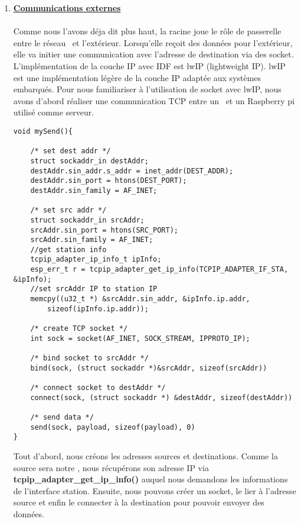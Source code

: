 \begin{enumerate}
        \item \textbf{\underline{Communications externes}}\\
            \\
            Comme nous l'avons déja dit plus haut, la racine joue le rôle de passerelle entre le réseau \espmesh\ 
            et l'extérieur. Lorsqu'elle reçoit des données pour l'extérieur, elle va initier une communication avec l'adresse
            de destination via des socket. L'implémentation de la couche IP avec IDF est lwIP (lightweight IP). lwIP est
            une implémentation légère de la couche IP adaptée aux systèmes embarqués. Pour nous familiariser à l'utilisation
            de socket avec lwIP, nous avons d'abord réaliser une communication TCP entre un \esp\ et un Raspberry pi utilisé
            comme serveur.
            \begin{verbatim}
void mySend(){

    /* set dest addr */
    struct sockaddr_in destAddr;
    destAddr.sin_addr.s_addr = inet_addr(DEST_ADDR);
    destAddr.sin_port = htons(DEST_PORT);
    destAddr.sin_family = AF_INET;

    /* set src addr */
    struct sockaddr_in srcAddr;
    srcAddr.sin_port = htons(SRC_PORT);
    srcAddr.sin_family = AF_INET;
    //get station info
    tcpip_adapter_ip_info_t ipInfo;
    esp_err_t r = tcpip_adapter_get_ip_info(TCPIP_ADAPTER_IF_STA, &ipInfo);
    //set srcAddr IP to station IP
    memcpy((u32_t *) &srcAddr.sin_addr, &ipInfo.ip.addr, 
        sizeof(ipInfo.ip.addr));

    /* create TCP socket */
    int sock = socket(AF_INET, SOCK_STREAM, IPPROTO_IP);

    /* bind socket to srcAddr */
    bind(sock, (struct sockaddr *)&srcAddr, sizeof(srcAddr))

    /* connect socket to destAddr */
    connect(sock, (struct sockaddr *) &destAddr, sizeof(destAddr))

    /* send data */
    send(sock, payload, sizeof(payload), 0)
}
            \end{verbatim}

            Tout d'abord, nous créons les adresses sources et destinations. Comme la source sera notre \esp,
            nous récupérons son adresse IP via \textbf{tcpip\_adapter\_get\_ip\_info()} auquel nous demandons
            les informations de l'interface station. Ensuite, nous pouvons créer un socket, le lier à l'adresse
            source et enfin le connecter à la destination pour pouvoir envoyer des données. 


\end{enumerate}

